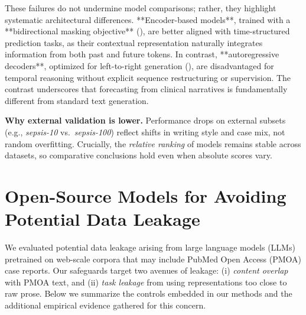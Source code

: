 These failures do not undermine model comparisons; rather, they highlight systematic architectural differences. **Encoder-based models**, trained with a **bidirectional masking objective** (\cite{devlin2019bert}), are better aligned with time-structured prediction tasks, as their contextual representation naturally integrates information from both past and future tokens. In contrast, **autoregressive decoders**, optimized for left-to-right generation (\cite{brown2020language}), are disadvantaged for temporal reasoning without explicit sequence restructuring or supervision. The contrast underscores that forecasting from clinical narratives is fundamentally different from standard text generation.
 
 \textbf{Why external validation is lower.} Performance drops on external subsets (e.g., \textit{sepsis-10} vs.\ \textit{sepsis-100}) reflect shifts in writing style and case mix, not random overfitting. Crucially, the \emph{relative ranking} of models remains stable across datasets, so comparative conclusions hold even when absolute scores vary.



\section{Open-Source Models for Avoiding Potential Data Leakage}
\label{apd:open_source}

We evaluated potential data leakage arising from large language models (LLMs) pretrained on web-scale corpora that may include PubMed Open Access (PMOA) case reports. Our safeguards target two avenues of leakage: (i) \emph{content overlap} with PMOA text, and (ii) \emph{task leakage} from using representations too close to raw prose. Below we summarize the controls embedded in our methods and the additional empirical evidence gathered for this concern.

